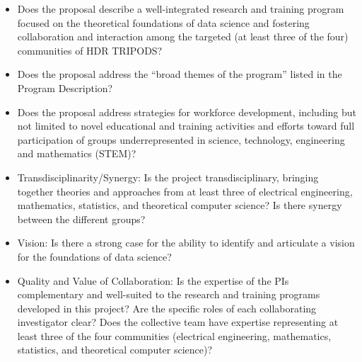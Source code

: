 \documentclass{article}
\begin{document}
\begin{itemize}
    \item Does the proposal describe a well-integrated research and training program focused on the theoretical foundations of data science and fostering collaboration and interaction among the targeted (at least three of the four) communities of HDR TRIPODS?
    \item Does the proposal address the “broad themes of the program” listed in the Program Description?
    \item Does the proposal address strategies for workforce development, including but not limited to novel educational and training activities and efforts toward full participation of groups underrepresented in science, technology, engineering and mathematics (STEM)? 
    
    \item Transdisciplinarity/Synergy: Is the project transdisciplinary, bringing together theories and approaches from at least three of electrical engineering, mathematics, statistics, and theoretical computer science? Is there synergy between the different groups?
    
    \item Vision: Is there a strong case for the ability to identify and articulate a vision for the foundations of data science?
    
    \item Quality and Value of Collaboration: Is the expertise of the PIs complementary and well-suited to the research and training programs developed in this project? Are the specific roles of each collaborating investigator clear? Does the collective team have expertise representing at least three of the four communities (electrical engineering, mathematics, statistics, and theoretical computer science)?
    

\end{itemize}
\end{document}

